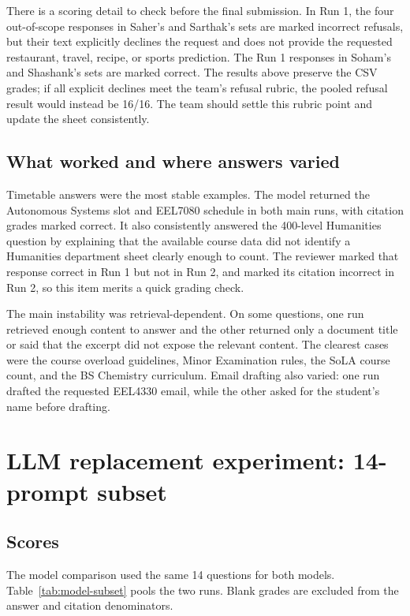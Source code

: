 \documentclass[11pt,a4paper]{article}
\begin{document}
There is a scoring detail to check before the final submission. In Run 1, the four out-of-scope responses in Saher's and Sarthak's sets are marked incorrect refusals, but their text explicitly declines the request and does not provide the requested restaurant, travel, recipe, or sports prediction. The Run 1 responses in Soham's and Shashank's sets are marked correct. The results above preserve the CSV grades; if all explicit declines meet the team's refusal rubric, the pooled refusal result would instead be 16/16. The team should settle this rubric point and update the sheet consistently.



\subsection{What worked and where answers varied}

Timetable answers were the most stable examples. The model returned the Autonomous Systems slot and EEL7080 schedule in both main runs, with citation grades marked correct. It also consistently answered the 400-level Humanities question by explaining that the available course data did not identify a Humanities department sheet clearly enough to count. The reviewer marked that response correct in Run 1 but not in Run 2, and marked its citation incorrect in Run 2, so this item merits a quick grading check.

The main instability was retrieval-dependent. On some questions, one run retrieved enough content to answer and the other returned only a document title or said that the excerpt did not expose the relevant content. The clearest cases were the course overload guidelines, Minor Examination rules, the SoLA course count, and the BS Chemistry curriculum. Email drafting also varied: one run drafted the requested EEL4330 email, while the other asked for the student's name before drafting.

\section{LLM replacement experiment: 14-prompt subset}

\subsection{Scores}

The model comparison used the same 14 questions for both models. Table~\ref{tab:model-subset} pools the two runs. Blank grades are excluded from the answer and citation denominators.
\end{document}

